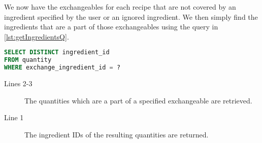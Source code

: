 We now have the exchangeables for each recipe that are not covered by an ingredient specified by the user or an ignored ingredient. We then simply find the ingredients that are a part of those exchangeables using the query in \autoref{lst:getIngredientsQ}.
\begin{lstlisting}[language=SQL, morekeywords={FIND_IN_SET}, float=h, label={lst:getIngredientsQ}, caption={Query to get the ingredient of an exchangeable, excluding ignored ingredients.}]
SELECT DISTINCT ingredient_id
FROM quantity
WHERE exchange_ingredient_id = ?
\end{lstlisting}
\begin{description}
\item[Lines 2-3] The quantities which are a part of a specified exchangeable are retrieved.
\item[Line 1] The ingredient IDs of the resulting quantities are returned.
\end{description}